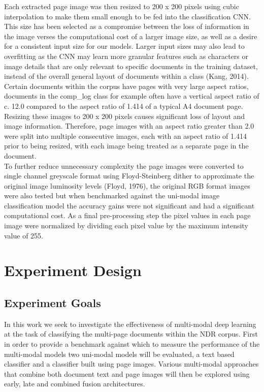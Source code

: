 \documentclass[a4paper,12pt]{article}
\begin{document}
Each extracted page image was then resized to 200 x 200 pixels using cubic interpolation to make them small enough to be fed into the classification CNN. This size has been selected as a compromise between the loss of information in the image verses the computational cost of a larger image size, as well as a desire for a consistent input size for our models. Larger input sizes may also lead to overfitting as the CNN may learn more granular features such as characters or image details that are only relevant to specific documents in the training dataset, instead of the overall general layout of documents within a class (Kang, 2014).\\

Certain documents within the corpus have pages with very large aspect ratios, documents in the comp\_log class for example often have a vertical aspect ratio of c. 12.0 compared to the aspect ratio of 1.414 of a typical A4 document page. Resizing these images to 200 x 200 pixels causes significant loss of layout and image information. Therefore, page images with an aspect ratio greater than 2.0 were split into multiple consecutive images, each with an aspect ratio of 1.414 prior to being resized, with each image being treated as a separate page in the document.\\

To further reduce unnecessary complexity the page images were converted to single channel greyscale format using Floyd-Steinberg dither to approximate the original image luminosity levels (Floyd, 1976), the original RGB format images were also tested but when benchmarked against the uni-modal image classification model the accuracy gains were not significant and had a significant computational cost. As a final pre-processing step the pixel values in each page image were normalized by dividing each pixel value by the maximum intensity value of 255.

\section{Experiment Design}
\subsection{Experiment Goals}
In this work we seek to investigate the effectiveness of multi-modal deep learning at the task of classifying the multi-page documents within the NDR corpus. First in order to provide a benchmark against which to measure the performance of the multi-modal models two uni-modal models will be evaluated, a text based classifier and a classifier built using page images. Various multi-modal approaches that combine both document text and page images will then be explored using early, late and combined fusion architectures. \\
\end{document}

